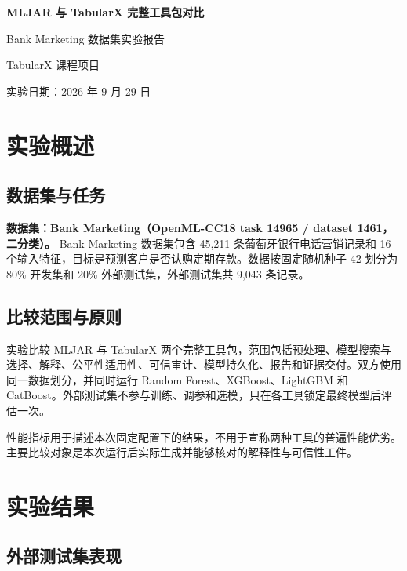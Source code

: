 \documentclass[degree=bachelor,language=chinese,fontset=fandol]{thuthesis}
\begin{document}
\begin{titlepage}
  \centering
  \vspace*{2.3cm}
  {\bfseries MLJAR 与 TabularX 完整工具包对比\par}
  \vspace{1.2cm}
  {Bank Marketing 数据集实验报告\par}
  \vspace{2.2cm}
  {TabularX 课程项目\par}
  \vfill
  {实验日期：2026 年 9 月 29 日\par}
  \vspace{1.2cm}
\end{titlepage}

\frontmatter
\tableofcontents

\mainmatter
\chapter{实验概述}

\section{数据集与任务}

\textbf{数据集：Bank Marketing（OpenML-CC18 task 14965 / dataset 1461，二分类）。}
Bank Marketing 数据集包含 45,211 条葡萄牙银行电话营销记录和 16 个输入特征，目标是预测客户是否认购定期存款。数据按固定随机种子 42 划分为 80\% 开发集和 20\% 外部测试集，外部测试集共 9,043 条记录。

\section{比较范围与原则}

实验比较 MLJAR 与 TabularX 两个完整工具包，范围包括预处理、模型搜索与选择、解释、公平性适用性、可信审计、模型持久化、报告和证据交付。双方使用同一数据划分，并同时运行 Random Forest、XGBoost、LightGBM 和 CatBoost。外部测试集不参与训练、调参和选模，只在各工具锁定最终模型后评估一次。

性能指标用于描述本次固定配置下的结果，不用于宣称两种工具的普遍性能优劣。主要比较对象是本次运行后实际生成并能够核对的解释性与可信性工件。

\chapter{实验结果}

\section{外部测试集表现}
\end{document}
